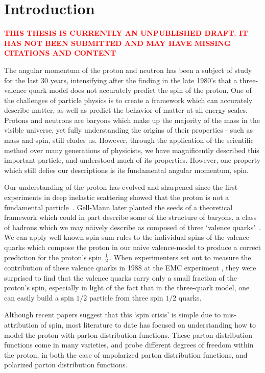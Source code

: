 \chapter{Introduction}

\textbf{\textcolor{red}{THIS THESIS IS CURRENTLY AN UNPUBLISHED DRAFT. IT HAS
NOT BEEN SUBMITTED AND MAY HAVE MISSING CITATIONS AND CONTENT}}

The angular momentum of the proton and neutron has been a subject of study for
the last 30 years, intensifying after the finding in the late 1980's that a
three-valence quark model does not accurately predict the spin of the proton.
One of the challenges of particle physics is to create a framework which can
accurately describe matter, as well as predict the behavior of matter at all
energy scales. Protons and neutrons are baryons which make up the majority of
the mass in the visible universe, yet fully understanding the origins of their
properties - such as  mass and spin, still eludes us. However, through the
application of the scientific method over many generations of physicists, we
have magnificently described this important particle, and understood much of its
properties. However, one property which still defies our descriptions is its
fundamental angular momentum, spin.
	
Our understanding of the proton has evolved and sharpened since the first
experiments in deep inelastic scattering showed that the proton is not a
fundamental particle~\cite{Breidenbach1969}. Gell-Mann later planted the seeds
of a theoretical framework which could in part describe some of the structure of
baryons, a class of hadrons which we may n{\"a}ively describe as composed of three
`valence quarks'~\cite{Bjorken1969}. We can apply well known spin-sum rules to the
individual spins of the valence quarks which compose the proton in our naive
valence-model to produce a correct prediction for the proton's spin
${1}\over{2}$. When experimenters set out to measure the contribution of these
valence quarks in 1988 at the EMC experiment \cite{Ashman1988}, they were
surprised to find that the valence quarks carry only a small fraction of the
proton's spin, especially in light of the fact that in the three-quark model,
one can easily build a spin $1/2$ particle from three spin $1/2$ quarks. 

Although recent papers \cite{Povh2016} suggest that this `spin
crisis' is simple due to mis-attribution of spin, most literature to date has
focused on understanding how to model the proton with parton distribution
functions. These parton distribution functions come in many varieties, and probe
different degrees of freedom within the proton, in both the case of unpolarized
parton distribution functions, and polarized parton distribution functions. 
 
